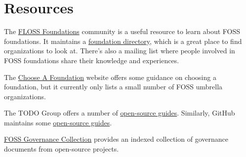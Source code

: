 


\chapter{Resources}

The \href{https://flossfoundations.org/}{FLOSS Foundations} community is a useful resource to learn about FOSS foundations.  It maintains a \href{https://flossfoundations.org/foundation-directory/}{foundation directory}, which is a great place to find organizations to look at.  There's also a mailing list where people involved in FOSS foundations share their knowledge and experiences.

The \href{http://chooseafoundation.com/}{Choose A Foundation} website offers some guidance on choosing a foundation, but it currently only lists a small number of FOSS umbrella organizations.

The TODO Group offers a number of \href{https://todogroup.org/guides/}{open-source guides}.  Similarly, GitHub maintains some \href{https://opensource.guide/}{open-source guides}.

\href{https://fossgovernance.org/}{FOSS Governance Collection} provides an indexed collection of governance documents from open-source projects.

